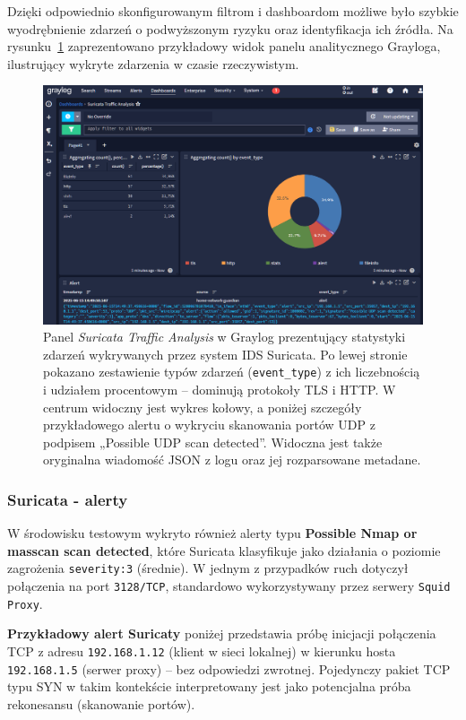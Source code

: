 \documentclass[
    left=2.5cm,         %
    right=2.5cm,        %
    top=2.5cm,          %
    bottom=3cm,         %
    bindingoffset=6mm,  %
    nohyphenation=true %
]{eiti/eiti-thesis} %
\begin{document}
Dzięki odpowiednio skonfigurowanym filtrom i dashboardom możliwe było szybkie wyodrębnienie zdarzeń o podwyższonym ryzyku oraz identyfikacja ich źródła. Na rysunku~\ref{fig:graylog-suricata-dashboard} zaprezentowano przykładowy widok panelu analitycznego Grayloga, ilustrujący wykryte zdarzenia w czasie rzeczywistym.

\begin{figure}[H]
    \centering
    \includegraphics[width=\textwidth]{img/graylog_alerts.png}
    \caption{Panel \textit{Suricata Traffic Analysis} w Graylog prezentujący statystyki zdarzeń wykrywanych przez system IDS Suricata. Po lewej stronie pokazano zestawienie typów zdarzeń (\texttt{event\_type}) z ich liczebnością i udziałem procentowym – dominują protokoły TLS  i HTTP. W centrum widoczny jest wykres kołowy, a poniżej szczegóły przykładowego alertu o wykryciu skanowania portów UDP z podpisem „Possible UDP scan detected”. Widoczna jest także oryginalna wiadomość JSON z logu oraz jej rozparsowane metadane.}
    \label{fig:graylog-suricata-dashboard}
\end{figure}


\subsubsection{Suricata - alerty}
W środowisku testowym wykryto również alerty typu \textbf{Possible Nmap or masscan scan detected}, które Suricata klasyfikuje jako działania o poziomie zagrożenia \texttt{severity:3} (średnie). W jednym z przypadków ruch dotyczył połączenia na port \texttt{3128/TCP}, standardowo wykorzystywany przez serwery \texttt{Squid Proxy}.

\textbf{Przykładowy alert Suricaty} poniżej przedstawia próbę inicjacji połączenia TCP z adresu \texttt{192.168.1.12} (klient w sieci lokalnej) w kierunku hosta \texttt{192.168.1.5} (serwer proxy) – bez odpowiedzi zwrotnej. Pojedynczy pakiet TCP typu SYN w takim kontekście interpretowany jest jako potencjalna próba rekonesansu (skanowanie portów).
\end{document}
